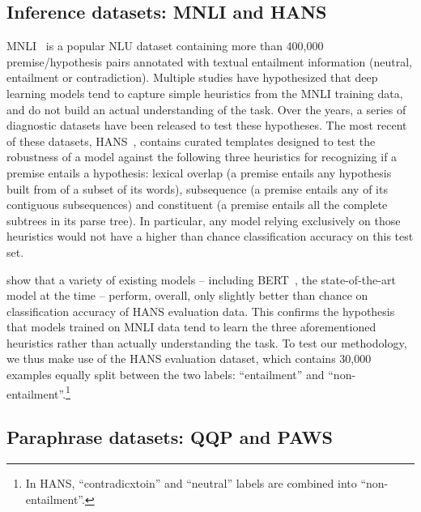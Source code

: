
\subsection{Inference datasets: MNLI and HANS}
\label{sec:dataset}
MNLI~\citep{williams2017broad} is a popular NLU dataset containing more than 400,000 premise/hypothesis pairs annotated with textual entailment information (neutral, entailment or contradiction). Multiple studies have hypothesized that deep learning models tend to capture simple heuristics from the MNLI training data, and do not build an actual understanding of the task. Over the years, a series of diagnostic datasets have been released to test these hypotheses.
The most recent of these datasets, HANS~\citep[Heuristic Analysis for NLI Systems]{linzen2019right}, contains curated templates designed to test the robustness of a model against the following three heuristics for recognizing if a premise entails a hypothesis: lexical overlap (a premise entails any hypothesis built from of a subset of its words), subsequence (a premise entails any of its contiguous subsequences) and constituent (a premise entails all the complete subtrees in its parse tree). In particular, any model relying exclusively on those heuristics would not have a higher than chance classification accuracy on this test set.

\citet{linzen2019right} show that a variety of existing models -- including BERT~\citep{devlin2018bert}, the state-of-the-art model at the time -- perform, overall, only slightly better than chance on classification accuracy of HANS evaluation data. This confirms the hypothesis that models trained on MNLI data tend to learn the three aforementioned heuristics rather than actually understanding the task. To test our methodology, we thus make use of the HANS evaluation dataset, which contains 30,000 examples equally split between the two labels: ``entailment'' and ``non-entailment''.\footnote{In HANS, ``contradicxtoin'' and ``neutral'' labels are combined into ``non-entailment''.}

\subsection{Paraphrase datasets: QQP and PAWS}
\label{sec:dataset_qqp}

